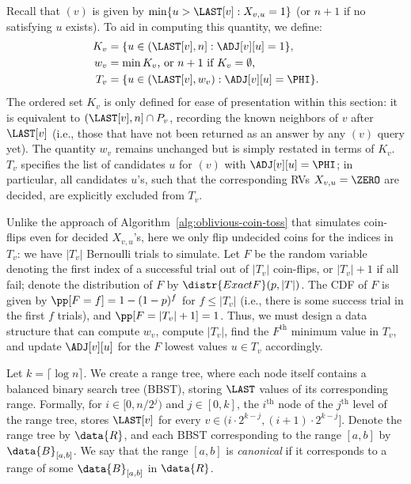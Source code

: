 Recall that $(v)$ is given by $\min\{u > \LAST[v]: X_{v,u} = 1\}$ (or $n+1$ if no satisfying $u$ exists). To aid in computing this quantity, we define:
\begin{align*}
K_v &= \{u \in (\LAST[v], n]: \ADJ[v][u]=1\},\\
w_v &= \min K_v \textrm{, or $n+1$ if $K_v = \emptyset$,} \\
T_v &= \{u \in (\LAST[v], w_v): \ADJ[v][u] = \PHI\}.
\end{align*}
The ordered set $K_v$ is only defined for ease of presentation within this section: it is equivalent to $(\LAST[v],n] \cap P_v$, recording the known neighbors of $v$ after $\LAST[v]$ (i.e., those that have not been returned as an answer by any $(v)$ query yet). The quantity $w_v$ remains unchanged but is simply restated in terms of $K_v$. $T_v$ specifies the list of candidates $u$ for $(v)$ with $\ADJ[v][u] = \PHI$; in particular, all candidates $u$'s, such that the corresponding RVs $X_{v,u} = \ZERO$ are decided, are explicitly excluded from $T_v$.

Unlike the approach of Algorithm~\ref{alg:oblivious-coin-toss} that simulates coin-flips even for decided $X_{v,u}$'s, here we only flip undecided coins for the indices in $T_v$: we have $|T_v|$ Bernoulli trials to simulate. Let $F$ be the random variable denoting the first index of a successful trial out of $|T_v|$ coin-flips, or $|T_v|+1$ if all fail; denote the distribution of $F$ by $\distr{ExactF}(p,|T|)$. The CDF of $F$ is given by $\pp[F = f] = 1-(1-p)^f$ for $f \leq |T_v|$ (i.e., there is some success trial in the first $f$ trials), and $\pp[F = |T_v|+1] = 1$. Thus, we must design a data structure that can compute $w_v$, compute $|T_v|$, find the $F^\textrm{th}$ minimum value in $T_v$, and update $\ADJ[v][u]$ for the $F$ lowest values $u \in T_v$ accordingly.

Let $k = \lceil \log n \rceil$. We create a range tree, where each node itself contains a balanced binary search tree (BBST), storing $\LAST$ values of its corresponding range. Formally, for $i \in [0, n/2^j)$ and $j \in [0, k]$, the $i^\textrm{th}$ node of the $j^\textrm{th}$ level of the range tree, stores $\LAST[v]$ for every $v \in (i \cdot 2^{k-j}, (i+1)\cdot 2^{k-j}]$. Denote the range tree by $\data{R}$, and each BBST corresponding to the range $[a, b]$ by $\data{B}_{[a,b]}$. We say that the range $[a,b]$  is \emph{canonical} if it corresponds to a range of some $\data{B}_{[a,b]}$ in $\data{R}$.

